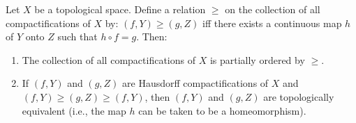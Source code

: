 Let $X$ be a topological space. Define a relation $\geq$ on the collection of all compactifications of $X$ by: $(f, Y) \geq (g, Z)$ iff there exists a continuous map $h$ of $Y$ onto $Z$ such that $h \circ f = g$. Then:
\begin{enumerate}
\item The collection of all compactifications of $X$ is partially ordered by $\geq$.
\item If $(f, Y)$ and $(g, Z)$ are Hausdorff compactifications of $X$ and $(f, Y) \geq (g, Z) \geq (f, Y)$, then $(f, Y)$ and $(g, Z)$ are topologically equivalent (i.e., the map $h$ can be taken to be a homeomorphism).
\end{enumerate}
